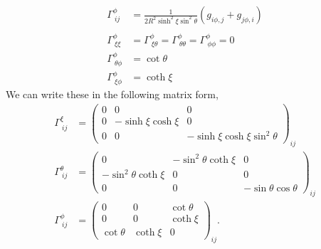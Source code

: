 \begin{equation}
\begin{split}
\Gamma^{\phi}_{\ ij} &= \frac{1}{2R^2\sinh^2\xi\sin^2\theta}\left(g_{i\phi,j} + g_{j\phi,i}\right)\\
\\
    \Gamma^{\phi}_{\ \xi\xi} &= \Gamma^{\phi}_{\ \xi\theta} = \Gamma^{\phi}_{\ \theta\theta} = \Gamma^{\phi}_{\ \phi\phi} =0\\
    \Gamma^{\phi}_{\ \theta\phi} &= \cot\theta\\
    \Gamma^{\phi}_{\ \xi\phi} &= \coth\xi
    \end{split}
\end{equation}
We can write these in the following matrix form, 
\begin{equation}
\begin{split}
\Gamma^{\xi}_{\ ij} &= 
\begin{pmatrix}
    0 & 0 & 0\\
    0 & -\sinh\xi\cosh\xi & 0\\
    0 & 0 & -\sinh\xi\cosh\xi\sin^2\theta
\end{pmatrix}_{ij}\\
\Gamma^{\theta}_{\ ij} &= 
\begin{pmatrix}
    0 & -\sin^2\theta\coth\xi & 0\\
    -\sin^2\theta\coth\xi & 0 & 0\\
    0 & 0 & -\sin\theta\cos\theta
\end{pmatrix}_{ij}\\
\Gamma^{\phi}_{\ ij} &= 
\begin{pmatrix}
    0 & 0 & \cot\theta\\
    0 & 0 & \coth\xi\\
    \cot\theta &\coth\xi & 0
    \end{pmatrix}_{ij}.
\end{split}
\end{equation}
